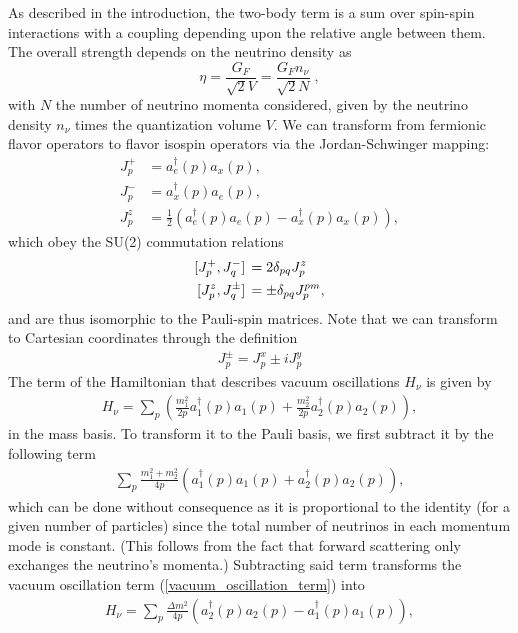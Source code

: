 \documentclass[Dual]{msu-thesis}
\begin{document}
As described in the introduction, the two-body term is a sum over spin-spin interactions with a coupling depending upon the relative angle between them. The overall strength depends on the neutrino density as
\begin{equation}
\label{eq:eta}
\eta=\frac{G_F}{\sqrt{2}V}=\frac{G_F n_\nu}{\sqrt{2}N}\;,
\end{equation}
with $N$ the number of neutrino momenta considered, given by the neutrino density $n_\nu$ times the quantization volume $V$. We can transform from fermionic flavor operators to flavor isospin operators via the Jordan-Schwinger mapping:
\begin{align}
\label{flavor_fermionic_to_isospin_jp}
J^+_p&=a^\dagger_e(p)a_x(p),
\\
\label{flavor_fermionic_to_isospin_jm}
J^-_p&=a^\dagger_x(p)a_e(p),
\\
\label{flavor_fermionic_to_isospin_jz}
J^z_p&=\frac{1}{2}\left(a^\dagger_e(p)a_e(p)-a^\dagger_x(p)a_x(p)\right)
,\end{align}
which obey the SU(2) commutation relations
\begin{align}
\comm*{J^+_p}{J^-_q}&=2\delta_{pq}J^z_p
\\
\comm*{J^z_p}{J^{\pm}_q}&=\pm\delta_{pq}J^{pm}_p
,\end{align}
and are thus isomorphic to the Pauli-spin matrices. Note that we can transform to Cartesian coordinates through the definition
\begin{align}
J^\pm_p=J^x_p\pm iJ^y_p
\end{align}
The term of the Hamiltonian that describes vacuum oscillations $H_\nu$ is given by
\begin{align}
\label{vacuum_oscillation_term}
H_\nu = \sum_{p}\left(\frac{m_1^2}{2p}a^\dagger_1(p)a_1(p)+\frac{m_2^2}{2p}a^\dagger_2(p)a_2(p)\right)
,\end{align}
in the mass basis. To transform it to the Pauli basis, we first subtract it by the following term
\begin{align}
\sum_p\frac{m_1^2+m_2^2}{4p}\left(a^\dagger_1(p)a_1(p)+a^\dagger_2(p)a_2(p)\right)
,\end{align}
which can be done without consequence as it is proportional to the identity (for a given number of particles) since the total number of neutrinos in each momentum mode is constant. (This follows from the fact that forward scattering only exchanges the neutrino's momenta.) Subtracting said term transforms the vacuum oscillation term (\ref{vacuum_oscillation_term}) into
\begin{align}
\label{vacuum_oscillation_term2}
H_\nu = \sum_p\frac{\Delta m^2}{4p}\left(a^\dagger_2(p)a_2(p)-a^\dagger_1(p)a_1(p)\right)
,\end{align}
\end{document}
